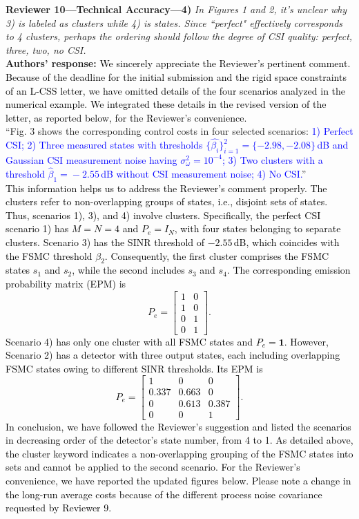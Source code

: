 \textbf{Reviewer 10---Technical Accuracy---4)}\textit{ %
In Figures 1 and 2, it's unclear why 3) is labeled as clusters while 4) is states. Since ``perfect" effectively corresponds to 4 clusters, perhaps the ordering should follow the degree of CSI quality: perfect, three, two, no CSI.}\\[2mm]
\textbf{Authors' response:} \textcolor{black}{We sincerely appreciate the Reviewer's pertinent comment. Because of the deadline for the initial submission and the rigid space constraints of an L-CSS letter, we have omitted details of the four scenarios analyzed in the numerical example. We integrated these details in the revised version of the letter, as reported below, for the Reviewer's convenience.}\\
``Fig. 3 shows the corresponding control costs in four selected scenarios: \textcolor{blue}{1) Perfect CSI; 2) Three measured states with thresholds $\{\hat{\beta_i}\}_{i=1}^{2} \!=\! \{-2.98,-2.08\}\,$dB and Gaussian CSI measurement noise having $\sigma_{\omega}^2=10^{-4}$; 3) Two clusters with a threshold $\hat{\beta}_1\!=\!-2.55\,$dB without CSI measurement noise; 4) No CSI.}''\\
\textcolor{black}{This information helps us to address the Reviewer's comment properly. The clusters refer to non-overlapping groups of states, i.e., disjoint sets of states. Thus, scenarios 1), 3), and 4) involve clusters. Specifically, the perfect CSI scenario 1) has $M=N=4$ and $P_e = I_N$, with four states belonging to separate clusters. Scenario 3) has the SINR threshold of $-2.55\,$dB, which coincides with the FSMC threshold $\beta_2$. Consequently, the first cluster comprises the FSMC states $s_1$ and $s_2$, while the second includes $s_3$ and $s_4$. The corresponding emission probability matrix (EPM) is 
\begin{equation*}
P_e=\begin{bmatrix}
1 & 0 \\ 1 & 0 \\ 0 & 1 \\ 0 & 1
\end{bmatrix}.
\end{equation*}
Scenario 4) has only one cluster with all FSMC states and $P_e=\bm{1}$. However, Scenario 2) has a detector with three output states, each including overlapping FSMC states owing to different SINR thresholds. Its EPM is 
\begin{equation*}
P_e=\begin{bmatrix}
1 & 0 & 0 \\ 0.337 & 0.663 & 0 \\ 0 & 0.613 & 0.387 \\ 0 & 0 & 1
\end{bmatrix}.
\end{equation*}
In conclusion, we have followed the Reviewer's suggestion and listed the scenarios in decreasing order of the detector's state number, from 4 to 1. As detailed above, the cluster keyword indicates a non-overlapping grouping of the FSMC states into sets and cannot be applied to the second scenario. For the Reviewer's convenience, we have reported the updated figures below. Please note a change in the long-run average costs because of the different process noise covariance requested by Reviewer 9.}
